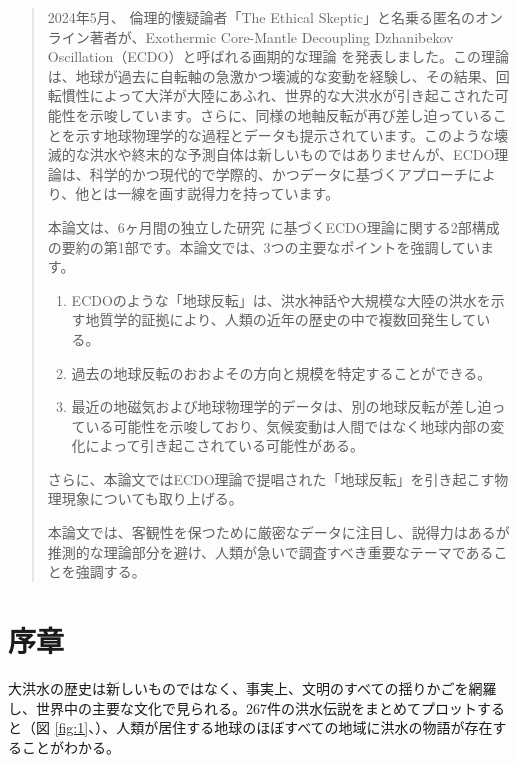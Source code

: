 \documentclass[10pt,twocolumn,letterpaper]{article}
\begin{document}
\begin{abstract}
2024年5月、 倫理的懐疑論者「The Ethical Skeptic」と名乗る匿名のオンライン著者が、Exothermic Core-Mantle Decoupling Dzhanibekov Oscillation（ECDO）と呼ばれる画期的な理論 \cite{0}\cite{1} を発表しました。この理論は、地球が過去に自転軸の急激かつ壊滅的な変動を経験し、その結果、回転慣性によって大洋が大陸にあふれ、世界的な大洪水が引き起こされた可能性を示唆しています。さらに、同様の地軸反転が再び差し迫っていることを示す地球物理学的な過程とデータも提示されています。このような壊滅的な洪水や終末的な予測自体は新しいものではありませんが、ECDO理論は、科学的かつ現代的で学際的、かつデータに基づくアプローチにより、他とは一線を画す説得力を持っています。

本論文は、6ヶ月間の独立した研究 \cite{2,20} に基づくECDO理論に関する2部構成の要約の第1部です。本論文では、3つの主要なポイントを強調しています。

\begin{flushleft}
\begin{enumerate}
    \item ECDOのような「地球反転」は、洪水神話や大規模な大陸の洪水を示す地質学的証拠により、人類の近年の歴史の中で複数回発生している。
    \item 過去の地球反転のおおよその方向と規模を特定することができる。
    \item 最近の地磁気および地球物理学的データは、別の地球反転が差し迫っている可能性を示唆しており、気候変動は人間ではなく地球内部の変化によって引き起こされている可能性がある。
\end{enumerate}
\end{flushleft}

さらに、本論文ではECDO理論で提唱された「地球反転」を引き起こす物理現象についても取り上げる。

本論文では、客観性を保つために厳密なデータに注目し、説得力はあるが推測的な理論部分を避け、人類が急いで調査すべき重要なテーマであることを強調する。
\end{abstract}

\section{序章}

大洪水の歴史は新しいものではなく、事実上、文明のすべての揺りかごを網羅し、世界中の主要な文化で見られる。267件の洪水伝説をまとめてプロットすると（図 \ref{fig:1}、\cite{3}）、人類が居住する地球のほぼすべての地域に洪水の物語が存在することがわかる。
\end{document}
